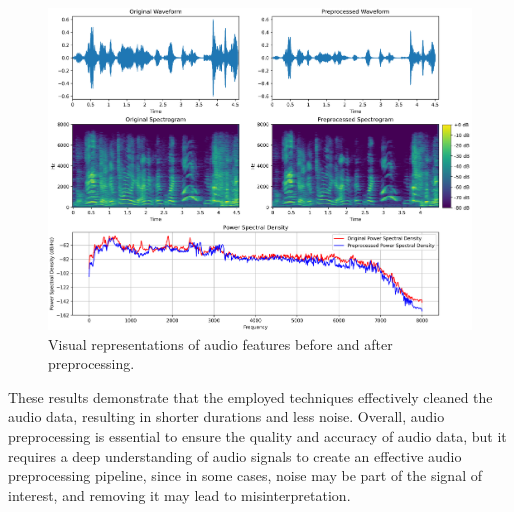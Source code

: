 \begin{figure}[H]
	\centering
	\includegraphics[width=\textwidth]{figs/4_2_preprocessing/preprocessing.png}
	\caption{Visual representations of audio features before and after preprocessing.}
	\label{fig:prep}
\end{figure}


These results demonstrate that the employed techniques effectively cleaned the audio data, resulting in shorter durations and less noise. Overall, audio preprocessing is essential to ensure the quality and accuracy of audio data, but it requires a deep understanding of audio signals to create an effective audio preprocessing pipeline, since in some cases, noise may be part of the signal of interest, and removing it may lead to misinterpretation.
